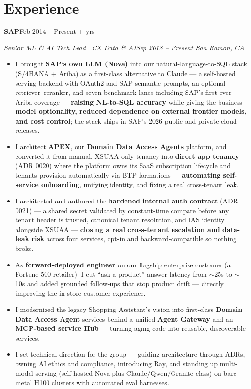 \documentclass[10pt,letterpaper]{article}
\newcommand{\entrygap}{1pt}
\newcommand{\company}[2]{{\scshape\bfseries #1}\hfill #2\par\vspace{0.5pt}}
\newcommand{\role}[2]{{\itshape #1}\hfill{\itshape #2}\par\vspace{1.5pt}}
\begin{document}
\section{Experience}
\company{SAP}{Feb 2014 -- Present \;\textbullet{}+ yrs}
\role{Senior ML \& AI Tech Lead \textbar\ CX Data \& AI}{Sep 2018 -- Present \;\textbullet\; San Ramon, CA}
\begin{itemize}
  \item I brought \textbf{SAP's own LLM (Nova)} into our natural-language-to-SQL stack (S/4HANA + Ariba)
  as a first-class alternative to Claude --- a self-hosted serving backend with OAuth2 and SAP-semantic
  prompts, an optional retriever--reranker, and seven benchmark lanes including SAP's first-ever Ariba
  coverage --- \textbf{raising NL-to-SQL accuracy} while giving the business \textbf{model optionality,
  reduced dependence on external frontier models, and cost control}; the stack ships in SAP's 2026
  public and private cloud releases.
  \item I architect \textbf{APEX}, our \textbf{Domain Data Access Agents} platform, and converted it
  from manual, XSUAA-only tenancy into \textbf{direct app tenancy} (ADR 0020) where the platform owns
  its SaaS subscription lifecycle and tenants provision automatically via BTP formations ---
  \textbf{automating self-service onboarding}, unifying identity, and fixing a real cross-tenant leak.
  \item I architected and authored the \textbf{hardened internal-auth contract} (ADR 0021) --- a shared
  secret validated by constant-time compare before any tenant header is trusted, canonical tenant
  resolution, and IAS identity alongside XSUAA --- \textbf{closing a real cross-tenant escalation and
  data-leak risk} across four services, opt-in and backward-compatible so nothing broke.
  \item As \textbf{forward-deployed engineer} on our flagship enterprise customer (a Fortune 500
  retailer), I cut ``ask a product'' answer latency from $\sim$25s to $\sim$10s and added grounded
  follow-ups that stop product drift --- directly improving the in-store customer experience.
  \item I modernized the legacy Shopping Assistant's vision into first-class \textbf{Domain Data Access
  Agent} services behind a unified \textbf{Agent Gateway} and an \textbf{MCP-based service Hub} ---
  turning aging code into reusable, discoverable services.
  \item I set technical direction for the group --- guiding architecture through ADRs, owning AI ethics
  and compliance, introducing Ray, and standing up multi-model serving (self-hosted Nova plus
  Claude/Qwen/Granite-class) on bare-metal H100 clusters with automated eval harnesses.
\end{itemize}
\vspace{\entrygap}
\end{document}
